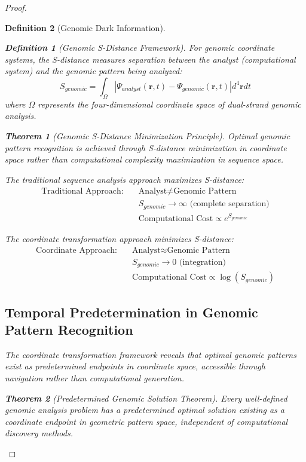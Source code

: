 \documentclass[12pt,a4paper]{article}
\newtheorem{theorem}{Theorem}
\newtheorem{definition}{Definition}
\begin{document}
\begin{proof}
\begin{definition}[Genomic Dark Information]
\begin{algorithm}[H]
\begin{definition}[Genomic S-Distance Framework]
For genomic coordinate systems, the S-distance measures separation between the analyst (computational system) and the genomic pattern being analyzed:
\begin{equation}
S_{genomic} = \int_{\Omega} |\Psi_{analyst}(\mathbf{r}, t) - \Psi_{genomic}(\mathbf{r}, t)| d^4\mathbf{r} dt
\end{equation}
where $\Omega$ represents the four-dimensional coordinate space of dual-strand genomic analysis.
\end{definition}

\begin{theorem}[Genomic S-Distance Minimization Principle]
Optimal genomic pattern recognition is achieved through S-distance minimization in coordinate space rather than computational complexity maximization in sequence space.
\end{theorem}

The traditional sequence analysis approach maximizes S-distance:
\begin{align}
\text{Traditional Approach:} \quad &\text{Analyst} \neq \text{Genomic Pattern} \\
&S_{genomic} \rightarrow \infty \text{ (complete separation)} \\
&\text{Computational Cost} \propto e^{S_{genomic}}
\end{align}

The coordinate transformation approach minimizes S-distance:
\begin{align}
\text{Coordinate Approach:} \quad &\text{Analyst} \approx \text{Genomic Pattern} \\
&S_{genomic} \rightarrow 0 \text{ (integration)} \\
&\text{Computational Cost} \propto \log(S_{genomic})
\end{align}

\subsection{Temporal Predetermination in Genomic Pattern Recognition}

The coordinate transformation framework reveals that optimal genomic patterns exist as predetermined endpoints in coordinate space, accessible through navigation rather than computational generation.

\begin{theorem}[Predetermined Genomic Solution Theorem]
Every well-defined genomic analysis problem has a predetermined optimal solution existing as a coordinate endpoint in geometric pattern space, independent of computational discovery methods.
\end{theorem}


\end{algorithm}
\end{definition}
\end{proof}
\end{document}
